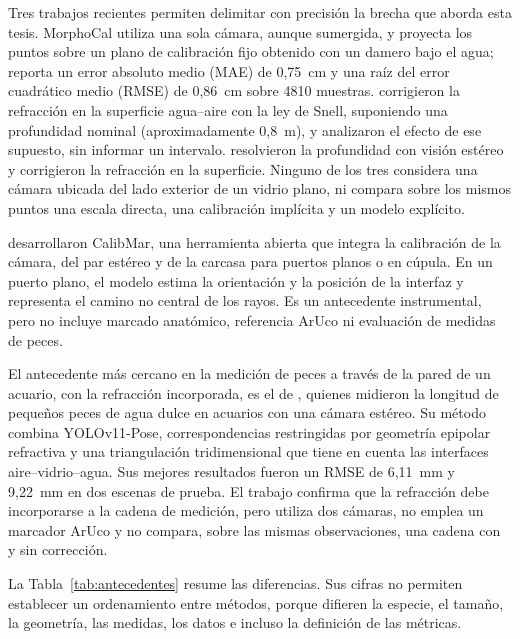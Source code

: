 Tres trabajos recientes permiten delimitar con precisión la brecha que aborda esta tesis. MorphoCal \parencite{Vijayalakshmi2026} utiliza una sola cámara, aunque sumergida, y proyecta los puntos sobre un plano de calibración fijo obtenido con un damero bajo el agua; reporta un error absoluto medio (MAE) de 0,75~cm y una raíz del error cuadrático medio (RMSE) de 0,86~cm sobre 4810 muestras. \textcite{Yin2026} corrigieron la refracción en la superficie agua--aire con la ley de Snell, suponiendo una profundidad nominal (aproximadamente 0,8~m), y analizaron el efecto de ese supuesto, sin informar un intervalo. \textcite{Zhou2023} resolvieron la profundidad con visión estéreo y corrigieron la refracción en la superficie. Ninguno de los tres considera una cámara ubicada del lado exterior de un vidrio plano, ni compara sobre los mismos puntos una escala directa, una calibración implícita y un modelo explícito.

\textcite{Seegraber2025} desarrollaron CalibMar, una herramienta abierta que integra la calibración de la cámara, del par estéreo y de la carcasa para puertos planos o en cúpula. En un puerto plano, el modelo estima la orientación y la posición de la interfaz y representa el camino no central de los rayos. Es un antecedente instrumental, pero no incluye marcado anatómico, referencia ArUco ni evaluación de medidas de peces.

El antecedente más cercano en la medición de peces a través de la pared de un acuario, con la refracción incorporada, es el de \textcite{Seibold2026}, quienes midieron la longitud de pequeños peces de agua dulce en acuarios con una cámara estéreo. Su método combina YOLOv11-Pose, correspondencias restringidas por geometría epipolar refractiva y una triangulación tridimensional que tiene en cuenta las interfaces aire--vidrio--agua. Sus mejores resultados fueron un RMSE de 6,11~mm y 9,22~mm en dos escenas de prueba. El trabajo confirma que la refracción debe incorporarse a la cadena de medición, pero utiliza dos cámaras, no emplea un marcador ArUco y no compara, sobre las mismas observaciones, una cadena con y sin corrección.

La Tabla~\ref{tab:antecedentes} resume las diferencias. Sus cifras no permiten establecer un ordenamiento entre métodos, porque difieren la especie, el tamaño, la geometría, las medidas, los datos e incluso la definición de las métricas.

